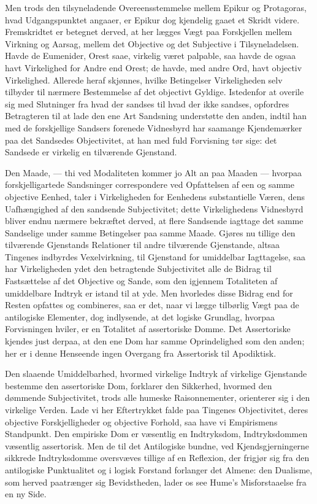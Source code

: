 \documentclass[12pt]{book}
\newcommand{\opage}[1]{\marginnote{\footnotesize\textit{[#1]}}}
\begin{document}
Men trods den tilsyneladende Overeensstemmelse mellem
Epikur og Protagoras, hvad Udgangspunktet angaaer, er
Epikur dog kjendelig gaaet et Skridt videre. Fremskridtet er
betegnet derved, at her lægges Vægt paa Forskjellen mellem
Virkning og Aarsag, mellem det Objective og det Subjective
i Tilsyneladelsen. Havde de Eumenider, Orest saae, virkelig
været palpable, saa havde de ogsaa havt Virkelighed for Andre
end Orest; de havde, med andre Ord, havt objectiv Virkelighed.
Allerede heraf skjønnes, hvilke Betingelser Virkeligheden
selv tilbyder til nærmere Bestemmelse af det objectivt Gyldige.
Istedenfor at overile sig med Slutninger fra hvad der sandses
til hvad der ikke sandses, opfordres Betragteren til at lade den
ene Art Sandsning understøtte den anden, indtil han med de
forskjellige Sandsers forenede Vidnesbyrd har saamange Kjendemærker
paa det Sandsedes Objectivitet, at han med fuld
Forvisning tør sige: det Sandsede er virkelig en tilværende
Gjenstand.

Den Maade, --- thi ved Modaliteten kommer jo Alt an
paa Maaden --- hvorpaa forskjelligartede Sandsninger correspondere
ved Opfattelsen af een og samme objective Eenhed,
taler i Virkeligheden for Eenhedens substantielle Væren, dens
Uafhængighed af den sandsende Subjectivitet; dette
Virkelig\opage{187}hedens Vidnesbyrd bliver endnu nærmere bekræftet derved, at
flere Sandsende iagttage det samme Sandselige under samme
Betingelser paa samme Maade. Gjøres nu tillige den tilværende
Gjenstands Relationer til andre tilværende Gjenstande,
altsaa Tingenes indbyrdes Vexelvirkning, til Gjenstand for
umiddelbar Iagttagelse, saa har Virkeligheden ydet den betragtende
Subjectivitet alle de Bidrag til Fastsættelse af det
Objective og Sande, som den igjennem Totaliteten af umiddelbare
Indtryk er istand til at yde. Men hvorledes disse
Bidrag end for Resten opfattes og combineres, saa er det,
naar vi lægge tilbørlig Vægt paa de antilogiske Elementer,
dog indlysende, at det logiske Grundlag, hvorpaa Forvisningen
hviler, er en Totalitet af assertoriske Domme. Det Assertoriske
kjendes just derpaa, at den ene Dom har samme Oprindelighed
som den anden; her er i denne Henseende ingen
Overgang fra Assertorisk til Apodiktisk.

Den slaaende Umiddelbarhed, hvormed virkelige Indtryk
af virkelige Gjenstande bestemme den assertoriske Dom, forklarer
den Sikkerhed, hvormed den dømmende Subjectivitet,
trods alle humeske Raisonnementer, orienterer sig i den virkelige
Verden. Lade vi her Eftertrykket falde paa Tingenes
Objectivitet, deres objective Forskjelligheder og objective Forhold,
saa have vi Empirismens Standpunkt. Den empiriske Dom er
væsentlig en Indtryksdom, Indtryksdommen væsentlig assertorisk.
Men de til det Antilogiske bundne, ved Kjendsgjerningerne
sikkrede Indtryksdomme oversvæves tillige af en Reflexion,
der frigjør sig fra den antilogiske Punktualitet og i
logisk Forstand forlanger det Almene: den Dualisme, som
herved paatrænger sig Bevidstheden, lader os see Hume's
Misforstaaelse fra en ny Side.
\end{document}
